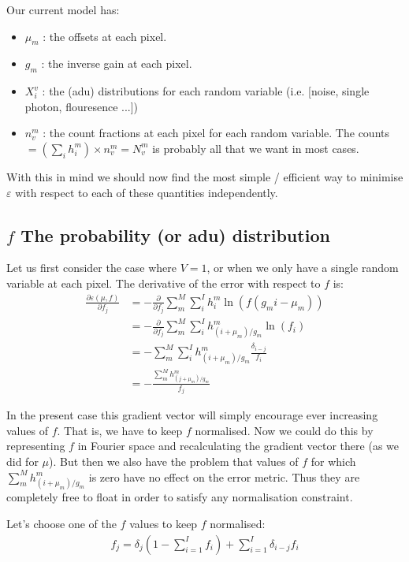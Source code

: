 \documentclass[11pt]{article}
\begin{document}
Our current model has:
\begin{itemize}
  \item $\mu_m$ : the offsets at each pixel.
  \item $g_m$   : the inverse gain at each pixel.
  \item $X^v_i$ : the (adu) distributions for each random variable (i.e. [noise, single photon, flouresence ...])
  \item $n^m_v$ : the count fractions at each pixel for each random variable. The counts $= (\sum_i h^m_i) \times n^m_v = N^m_v$ is probably all that we want in most cases.
\end{itemize}

With this in mind we should now find the most simple / efficient way to minimise $\varepsilon$ with respect to each of these quantities independently. 


\subsection{$f$ The probability (or adu) distribution}
Let us first consider the case where $V=1$, or when we only have a single random variable at each pixel. The derivative of the error with respect to $f$ is:
\begin{align}
   \frac{\partial \varepsilon(\mu, f)}{\partial f_j} &= -\frac{\partial}{\partial f_j} \sum_m^M \sum_i^I h^m_i \ln(f(g_mi - \mu_m)) \\
   &= -\frac{\partial}{\partial f_j} \sum_m^M \sum_i^I h^m_{(i+\mu_m)/g_m} \ln(f_i) \\
   &= -\sum_m^M \sum_i^I h^m_{(i+\mu_m)/g_m} \frac{\delta_{i-j}}{f_i} \\
   &= -\frac{\sum_m^M h^m_{(j+\mu_m)/g_m}}{f_j}
\end{align}

In the present case this gradient vector will simply encourage ever increasing values of $f$. That is, we have to keep $f$ normalised. Now we could do this by representing $f$ in Fourier space and recalculating the gradient vector there (as we did for $\mu$). But then we also have the problem that values of $f$ for which $\sum_m^M h^m_{(i+\mu_m)/g_m}$ is zero have no effect on the error metric. Thus they are completely free to float in order to satisfy any normalisation constraint.

Let's choose one of the $f$ values to keep $f$ normalised:
\begin{align}
   f_j = \delta_{j} (1 - \sum_{i=1}^I f_i) + \sum_{i=1}^I \delta_{i-j} f_i
\end{align}
\end{document}
